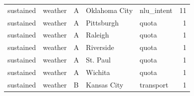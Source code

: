 \begin{tabular}{lllllr}
sustained & weather & A & Oklahoma City & nlu_intent & 11 \\
sustained & weather & A & Pittsburgh & quota & 1 \\
sustained & weather & A & Raleigh & quota & 1 \\
sustained & weather & A & Riverside & quota & 1 \\
sustained & weather & A & St. Paul & quota & 1 \\
sustained & weather & A & Wichita & quota & 1 \\
sustained & weather & B & Kansas City & transport & 1 \\
\bottomrule
\end{tabular}
